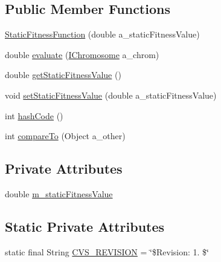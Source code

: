 \subsection*{Public Member Functions}
\begin{DoxyCompactItemize}
\item 
\hyperlink{classorg_1_1jgap_1_1impl_1_1_static_fitness_function_abc626bcd5dfee9d8a63c08e9e0b07f77}{Static\-Fitness\-Function} (double a\-\_\-static\-Fitness\-Value)
\item 
double \hyperlink{classorg_1_1jgap_1_1impl_1_1_static_fitness_function_a0be7d9763e3cd063933c2ac39c742b41}{evaluate} (\hyperlink{interfaceorg_1_1jgap_1_1_i_chromosome}{I\-Chromosome} a\-\_\-chrom)
\item 
double \hyperlink{classorg_1_1jgap_1_1impl_1_1_static_fitness_function_a87a808081cd1441f5f960bc081d81aa3}{get\-Static\-Fitness\-Value} ()
\item 
void \hyperlink{classorg_1_1jgap_1_1impl_1_1_static_fitness_function_a9a4d5a77f592bc05608a9bbfcd1ed5c8}{set\-Static\-Fitness\-Value} (double a\-\_\-static\-Fitness\-Value)
\item 
int \hyperlink{classorg_1_1jgap_1_1impl_1_1_static_fitness_function_a86125e88d554e42788b629ac4361a2af}{hash\-Code} ()
\item 
int \hyperlink{classorg_1_1jgap_1_1impl_1_1_static_fitness_function_ae45437e7ddf67ad974eca2b4719f50b5}{compare\-To} (Object a\-\_\-other)
\end{DoxyCompactItemize}
\subsection*{Private Attributes}
\begin{DoxyCompactItemize}
\item 
double \hyperlink{classorg_1_1jgap_1_1impl_1_1_static_fitness_function_a5879bc886826bcc49e51f3dc8e44a365}{m\-\_\-static\-Fitness\-Value}
\end{DoxyCompactItemize}
\subsection*{Static Private Attributes}
\begin{DoxyCompactItemize}
\item 
static final String \hyperlink{classorg_1_1jgap_1_1impl_1_1_static_fitness_function_af3a56f02acc3ec5483449ee5dee8b9a1}{C\-V\-S\-\_\-\-R\-E\-V\-I\-S\-I\-O\-N} = \char`\"{}\$Revision\-: 1. \$\char`\"{}
\end{DoxyCompactItemize}
